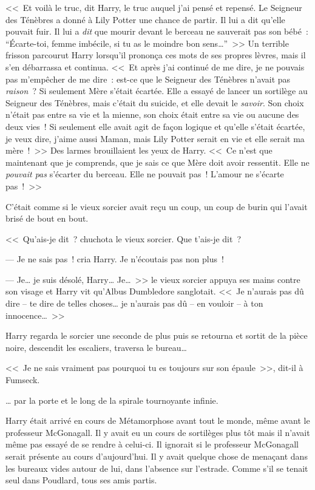 <<~Et voilà le truc, dit Harry, le truc auquel j'ai pensé et repensé. Le Seigneur des Ténèbres a donné à Lily Potter une chance de partir. Il lui a dit qu'elle pouvait fuir. Il lui a \emph{dit} que mourir devant le berceau ne sauverait pas son bébé~: “Écarte-toi, femme imbécile, si tu as le moindre bon sens…”~>> Un terrible frisson parcourut Harry lorsqu'il prononça ces mots de ses propres lèvres, mais il s'en débarrassa et continua. <<~Et après j'ai continué de me dire, je ne pouvais pas m'empêcher de me dire~: est-ce que le Seigneur des Ténèbres n'avait pas \emph{raison}~? Si seulement Mère s'était écartée. Elle a essayé de lancer un sortilège au Seigneur des Ténèbres, mais c'était du suicide, et elle devait le \emph{savoir}. Son choix n'était pas entre sa vie et la mienne, son choix était entre sa vie ou aucune des deux vies~! Si seulement elle avait agit de façon logique et qu'elle s'était écartée, je veux dire, j'aime aussi Maman, mais Lily Potter serait en vie et elle serait ma mère~!~>> Des larmes brouillaient les yeux de Harry. <<~Ce n'est que maintenant que je comprends, que je sais ce que Mère doit avoir ressentit. Elle ne \emph{pouvait pas} s'écarter du berceau. Elle ne pouvait pas~! L'amour ne s'écarte pas~!~>>

C'était comme si le vieux sorcier avait reçu un coup, un coup de burin qui l'avait brisé de bout en bout.

<<~Qu'ais-je dit~? chuchota le vieux sorcier. Que t'ais-je dit~?

--- Je ne sais pas~! cria Harry. Je n'écoutais pas non plus~!

--- Je… je suis désolé, Harry… Je…~>> le vieux sorcier appuya ses mains contre son visage et Harry vit qu'Albus Dumbledore sanglotait. <<~Je n'aurais pas dû dire -- te dire de telles choses… je n'aurais pas dû -- en vouloir -- à ton innocence…~>>

Harry regarda le sorcier une seconde de plus puis se retourna et sortit de la pièce noire, descendit les escaliers, traversa le bureau…

<<~Je ne sais vraiment pas pourquoi tu es toujours sur son épaule~>>, dit-il à Fumseck.

… par la porte et le long de la spirale tournoyante infinie.

\later

Harry était arrivé en cours de Métamorphose avant tout le monde, même avant le professeur McGonagall. Il y avait eu un cours de sortilèges plus tôt mais il n'avait même pas essayé de se rendre à celui-ci. Il ignorait si le professeur McGonagall serait présente au cours d'aujourd'hui. Il y avait quelque chose de menaçant dans les bureaux vides autour de lui, dans l'absence sur l'estrade. Comme s'il se tenait seul dans Poudlard, tous ses amis partis.

